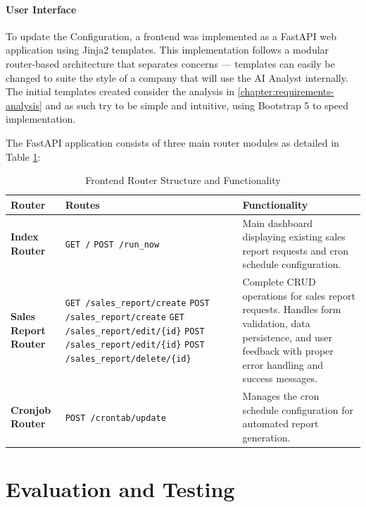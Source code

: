 \documentclass[a4paper]{report}
\begin{document}
\subsubsection{User Interface}

To update the Configuration, a frontend was implemented as a FastAPI web application using Jinja2 templates. This implementation follows a modular router-based architecture that separates concerns --- templates can easily be changed to suite the style of a company that will use the AI Analyst internally. The initial templates created consider the analysis in \autoref{chapter:requirements-analysis} and as such try to be simple and intuitive, using Bootstrap 5 to speed implementation.

The FastAPI application consists of three main router modules as detailed in Table \ref{tab:frontend-routes}:

\begin{table}[H]
\centering
\begin{tabular}{|p{3cm}|p{5.5cm}|p{6cm}|}
\hline
\textbf{Router} & \textbf{Routes} & \textbf{Functionality} \\ \hline
\textbf{Index Router} & 
\texttt{GET /} \newline \texttt{POST /run\_now} & 
Main dashboard displaying existing sales report requests and cron schedule configuration. \\ \hline
\textbf{Sales Report Router} & 
\texttt{GET /sales\_report/create} \newline \texttt{POST /sales\_report/create} \newline \texttt{GET /sales\_report/edit/\{id\}} \newline \texttt{POST /sales\_report/edit/\{id\}} \newline \texttt{POST /sales\_report/delete/\{id\}} & 
Complete CRUD operations for sales report requests. Handles form validation, data persistence, and user feedback with proper error handling and success messages. \\ \hline

\textbf{Cronjob Router} & 
\texttt{POST /crontab/update} & 
Manages the cron schedule configuration for automated report generation. \\ \hline
\end{tabular}
\caption{Frontend Router Structure and Functionality}
\label{tab:frontend-routes}
\end{table}

\chapter{Evaluation and Testing}
\label{chapter:evaluation-testing}
\end{document}
